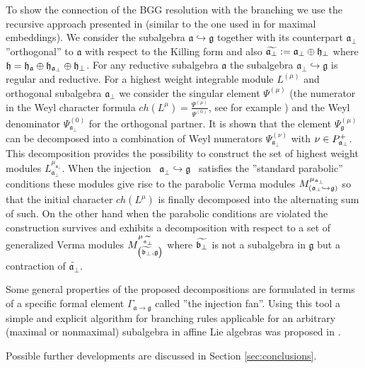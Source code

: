 \documentclass[12pt]{article}
\theoremstyle{definition}
\newcommand{\gf}{\mathfrak{g}}
\newcommand{\af}{\mathfrak{a}}
\newcommand{\afb}{\mathfrak{a}_{\bot}}
\begin{document}
To show the connection of the BGG resolution with the branching we use the recursive approach presented in \cite
{2010arXiv1007.0318L} (similar to the one used in \cite{ilyin812pbc} for
maximal embeddings). We consider the subalgebra $\af \hookrightarrow \gf$ together with its
counterpart $\afb$ ''orthogonal'' to $\af$ with respect to
the Killing form and also $\widetilde{\afb}:=\afb\oplus \frak{h}_{\perp }$ where $\frak{h}=\frak{\frak{h}_{\af}}\oplus
\frak{h}_{\afb}\oplus \frak{h}_{\perp }$. For any reductive
subalgebra $\af$ the subalgebra $\afb\hookrightarrow \gf$
is regular and reductive. For a highest weight integrable module $%
L^{\left(\mu \right) }$ and orthogonal subalgebra $\af_{\bot }$ we
consider the singular element $\Psi ^{\left( \mu \right) }$ (the numerator
in the Weyl character formula $ch\left( L^{\mu }\right) =\frac{\Psi ^{\left(
\mu \right) }}{\Psi ^{\left( 0\right) }}$, see for example \cite
{humphreys1997introduction}) and the Weyl denominator $\Psi _{\af_{\bot
}}^{\left( 0\right) }$ for the orthogonal partner. It is shown that the element $\Psi _{\gf%
}^{\left( \mu \right) }$ can be decomposed into a combination of Weyl
numerators $\Psi _{\af_{\bot }}^{\left( \nu \right) }$ with $\nu \in P_{%
\mathfrak{a}_{\bot}}^{+}$. This decomposition provides the possibility to
construct the set of highest weight modules $L_{\afb}%
^{\mu _{\afb}}$. When the injection \ $\af%
_{\bot }\hookrightarrow \gf$ \ satisfies the ''standard parabolic''
conditions these modules give rise to the parabolic Verma modules $M_{\left(
\afb \hookrightarrow \gf\right) }^{\mu _{%
\afb}}$ so that the initial character $ch\left(
L^{\mu }\right) $ is finally decomposed into the alternating sum of such. On
the other hand when the parabolic conditions are violated the construction
survives and exhibits a decomposition with respect to a set of generalized Verma
modules $M_{\left( \widetilde{\frak{b}_{\perp }},\gf\right) }^{\mu _{%
\widetilde{\afb}}}$ where $%
\widetilde{\frak{b}_{\perp }}$ is not a subalgebra in $\gf$ but a
contraction of $\widetilde{\afb}$.

Some general properties of the proposed decompositions are formulated in
terms of a specific formal element $\Gamma _{\af\rightarrow \gf}$  called ''the injection fan''. Using this tool a simple and explicit algorithm for branching
rules applicable for an arbitrary (maximal or
nonmaximal) subalgebra in affine Lie algebras was
proposed in \cite{2010arXiv1007.0318L}.


Possible further developments are discussed in Section \ref{sec:conclusions}.
\end{document}
